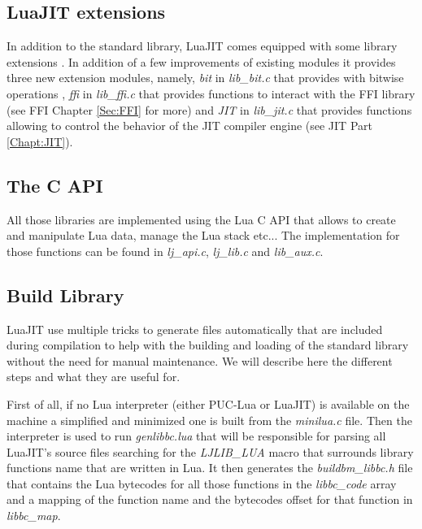 \subsection{LuaJIT extensions}
\label{Subsec:lj-extensions}

In addition to the standard library, LuaJIT comes equipped with some library
extensions \cite{extensions}. In addition of a few improvements of existing
modules it provides three new extension modules, namely, \emph{bit} in
\emph{lib\_bit.c} that provides with bitwise operations \cite{bitOp}, \emph{ffi}
in \emph{lib\_ffi.c} that provides functions to interact with the FFI library
(see FFI Chapter \ref{Sec:FFI} for more) and \emph{JIT} in \emph{lib\_jit.c}
that provides functions allowing to control the behavior of the JIT compiler
engine (see JIT Part \ref{Chapt:JIT}).


\subsection{The C API}
\label{Subsec:c-api}

All those libraries are implemented using the Lua C API that allows to create
and manipulate Lua data, manage the Lua stack etc... The implementation for those
functions can be found in \emph{lj\_api.c}, \emph{lj\_lib.c} and \emph{lib\_aux.c}.


\subsection{Build Library}
\label{Subsec:build-lib}

LuaJIT use multiple tricks to generate files automatically that are included
during compilation to help with the building and loading of the standard library
without the need for manual maintenance. We will describe here the different
steps and what they are useful for.

First of all, if no Lua interpreter
(either PUC-Lua or LuaJIT) is available on the machine a simplified and
minimized one is built from the \emph{minilua.c} file. Then the interpreter is
used to run \emph{genlibbc.lua} that will be responsible for parsing all LuaJIT's
source files searching for the \emph{LJLIB\_LUA} macro that surrounds library
functions name that are written in Lua. It then generates the \emph{buildbm\_libbc.h}
file that contains the Lua bytecodes for all those functions in the
\emph{libbc\_code} array and a mapping of the function name and the bytecodes
offset for that function in \emph{libbc\_map}.

